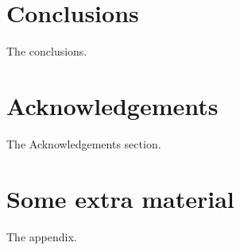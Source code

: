 \documentclass[a4paper,fleqn,usenatbib]{mnras}
\begin{document}
\section{Conclusions}

The conclusions.

\section*{Acknowledgements}

The Acknowledgements section.




%

\appendix

\section{Some extra material}

The appendix.



\bsp	%
\label{lastpage}
\end{document}
